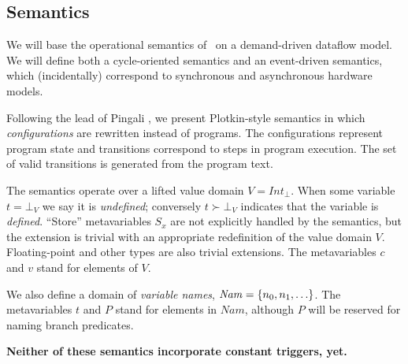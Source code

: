 \documentclass[12pt,notitlepage,twoside]{article}
\begin{document}
\subsection{Semantics}\label{sec:semantics}
We will base the operational semantics of \ssiplus\ on a demand-driven
dataflow model.  We will define both a cycle-oriented semantics and an
event-driven semantics, which (incidentally) correspond to synchronous
and asynchronous hardware models.

Following the lead of Pingali \cite{pingali90:dfg}, we present Plotkin-style
semantics \cite{plotkin81:opsem} in which \emph{configurations} are
rewritten instead of programs.  The configurations represent program
state and transitions correspond to steps in program execution.  The
set of valid transitions is generated from the program text.

The semantics operate over a lifted value domain
$V=\mathit{Int}_\bot$. When some variable $t = \bot_V$ we say it is
\emph{undefined}; conversely $t\succ\bot_V$ indicates that the
variable is \emph{defined}.  ``Store'' metavariables $S_x$ are not
explicitly handled by the semantics, but the extension is trivial with
an appropriate redefinition of the value domain $V$.  Floating-point
and other types are also trivial extensions.  The
metavariables $c$ and $v$ stand for elements of $V$.

We also define a domain of \emph{variable names},
$\mathit{Nam}=\left\{n_0,n_1,\ldots\right\}$.  The metavariables $t$ and $P$ stand for
elements in $\mathit{Nam}$, although $P$ will be reserved for naming branch predicates.

\textbf{Neither of these semantics incorporate constant triggers, yet.}
\end{document}
